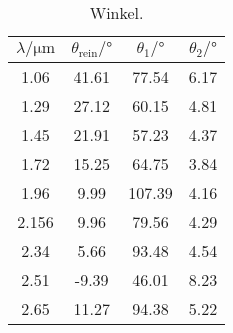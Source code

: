 \begin{table} \caption{Winkel.}
    \label{tab:skaliert}
    \centering
    \begin{tabular}{cccc}
        \toprule
        {$\lambda / \si{\micro\meter}$} & {$\theta_\text{rein}/ \si{\degree}$} & {$\theta_1/ \si{\degree}$} & {$\theta_2/ \si{\degree}$} \\
        \midrule
     1.06 &  41.61 &  77.54   &   6.17 \\
     1.29 &  27.12 &  60.15   &   4.81 \\
     1.45 &  21.91 &  57.23   &   4.37 \\
     1.72 &  15.25 &  64.75   &   3.84 \\
     1.96 &  9.99  &  107.39  &   4.16 \\
     2.156&  9.96  &  79.56   &   4.29 \\
     2.34 &  5.66  &  93.48   &   4.54 \\
     2.51 &  -9.39 &  46.01   &   8.23 \\
     2.65 &  11.27 &  94.38   &   5.22 \\
        
        \bottomrule
    \end{tabular}
\end{table}